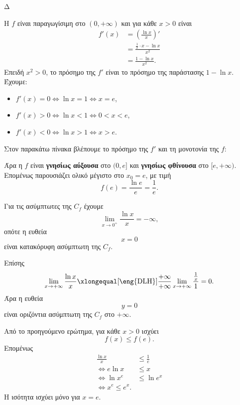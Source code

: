 \begin{thema}{Δ}
\begin{erwthma}
\item Η $f$ είναι παραγωγίσιμη στο $(0,+\infty)$ και για κάθε $x>0$ είναι
\begin{align*}
f'(x)
&=\left(\frac{\ln x}{x}\right)'\\
&=\frac{\frac{1}{x}\cdot x-\ln x}{x^2}\\
&=\frac{1-\ln x}{x^2}.
\end{align*}
Επειδή $x^2>0$, το πρόσημο της $f'$ είναι το πρόσημο της παράστασης $1-\ln x$. Έχουμε:
\begin{itemize}
\item $f'(x)=0\Leftrightarrow \ln x=1\Leftrightarrow x=e$,
\item $f'(x)>0\Leftrightarrow \ln x<1\Leftrightarrow 0<x<e$,
\item $f'(x)<0\Leftrightarrow \ln x>1\Leftrightarrow x>e$.
\end{itemize}
Στον παρακάτω πίνακα βλέπουμε το πρόσημο της $f'$ και τη μονοτονία της $f$:
\begin{center}
\end{center}

Άρα η $f$ είναι \textbf{γνησίως αύξουσα} στο $(0,e]$ και \textbf{γνησίως φθίνουσα} στο $[e,+\infty)$. Επομένως παρουσιάζει ολικό μέγιστο στο $x_0=e$, με τιμή
\[
{f(e)=\frac{\ln e}{e}=\frac{1}{e}}.
\]

Για τις ασύμπτωτες της $C_f$ έχουμε
\[
\lim_{x\to0^+}\frac{\ln x}{x}=-\infty,
\]
οπότε η ευθεία
\[
{x=0}
\]
είναι κατακόρυφη ασύμπτωτη της $C_f$.

Επίσης
\[
\lim_{x\to+\infty}\frac{\ln x}{x}
\xlongequal[\text{\eng{DLH}}]{\frac{+\infty}{+\infty}}
\lim_{x\to+\infty}\frac{\frac{1}{x}}{1}
=0.
\]
Άρα η ευθεία
\[
{y=0}
\]
είναι οριζόντια ασύμπτωτη της $C_f$ στο $+\infty$.

\item Από το προηγούμενο ερώτημα, για κάθε $x>0$ ισχύει
\[
f(x)\leq f(e).
\]
Επομένως
\begin{align*}
\frac{\ln x}{x}
&\leq\frac{1}{e}\\
\Leftrightarrow e\ln x&\leq x\\
\Leftrightarrow \ln x^e&\leq\ln e^x\\
\Leftrightarrow {x^e\leq e^x}.
\end{align*}
Η ισότητα ισχύει μόνο για $x=e$.


\end{erwthma}
\end{thema}

